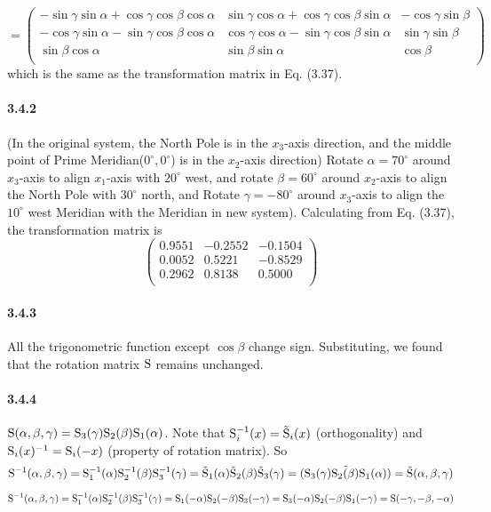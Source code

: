 \documentclass[a4paper]{article}
\begin{document}
\[=
\begin{pmatrix}
-\sin\gamma\sin\alpha+\cos\gamma\cos\beta\cos\alpha&
\sin\gamma\cos\alpha+\cos\gamma\cos\beta\sin\alpha&
-\cos\gamma\sin\beta\\
-\cos\gamma\sin\alpha-\sin\gamma\cos\beta\cos\alpha&
\cos\gamma\cos\alpha-\sin\gamma\cos\beta\sin\alpha&
\sin\gamma\sin\beta\\
\sin\beta\cos\alpha&
\sin\beta\sin\alpha&
\cos\beta\\
\end{pmatrix}
\]
which is the same as the transformation matrix in Eq. (3.37).

\paragraph{3.4.2}
(In the original system, the North Pole is in the $x_3$-axis direction, and the middle point of Prime Meridian($0^\circ,0^\circ$) is in the $x_2$-axis direction) Rotate $\alpha=70^\circ$ around $x_3$-axis to align $x_1$-axis with $20^\circ$ west, and rotate $\beta=60^\circ$ around $x_2$-axis to align the North Pole with $30^\circ$ north, and Rotate $\gamma=-80^\circ$ around $x_3$-axis to align the $10^\circ$ west Meridian with the Meridian in new system). Calculating from Eq. (3.37), the transformation matrix is 
\[
\begin{pmatrix}
0.9551&-0.2552&-0.1504\\
0.0052&0.5221&-0.8529\\
0.2962&0.8138&0.5000\\
\end{pmatrix}
\]

\paragraph{3.4.3}
All the trigonometric function except $\cos\beta$ change sign. Substituting, we found that the rotation matrix $\mathrm{S}$ remains unchanged.

\paragraph{3.4.4}
$\mathrm{S}(\alpha,\beta,\gamma)=\mathrm{S}_3(\gamma)\mathrm{S}_2(\beta)\mathrm{S}_1(\alpha)$. Note that $\mathrm{S}_i^{-1}(x)=\tilde{\mathrm{S}}_i(x)$ (orthogonality) and $\mathrm{S}_i(x)^{-1}=\mathrm{S}_i(-x)$ (property of rotation matrix). So 
\[\mathrm{S}^{-1}(\alpha,\beta,\gamma)=\mathrm{S}_1^{-1}(\alpha)\mathrm{S}_2^{-1}(\beta)\mathrm{S}_3^{-1}(\gamma)=\tilde{\mathrm{S}}_1(\alpha)\tilde{\mathrm{S}}_2(\beta)\tilde{\mathrm{S}}_3(\gamma)=\tilde{(\mathrm{S}_3(\gamma)\mathrm{S}_2(\beta)\mathrm{S}_1(\alpha))}=\tilde{\mathrm{S}}(\alpha,\beta,\gamma)\]
\[\mathrm{S}^{-1}(\alpha,\beta,\gamma)=\mathrm{S}_1^{-1}(\alpha)\mathrm{S}_2^{-1}(\beta)\mathrm{S}_3^{-1}(\gamma)=\mathrm{S}_1(-\alpha)\mathrm{S}_2(-\beta)\mathrm{S}_3(-\gamma)=\mathrm{S}_3(-\alpha)\mathrm{S}_2(-\beta)\mathrm{S}_1(-\gamma)=\mathrm{S}(-\gamma,-\beta,-\alpha)\]
\end{document}
